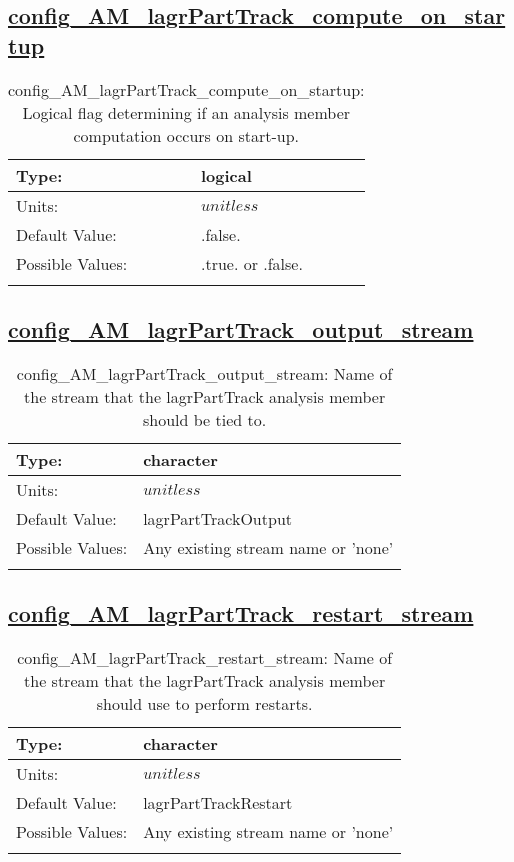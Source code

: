 \subsection[config\_AM\_lagrPartTrack\_compute\_on\_startup]{\hyperref[sec:nm_tab_AM_lagrPartTrack]{config\_AM\_lagrPartTrack\_compute\_on\_startup}}
\label{subsec:nm_sec_config_AM_lagrPartTrack_compute_on_startup}
\begin{center}
\begin{longtable}{| p{2.0in} || p{4.0in} |}
    \hline
    Type: & logical \\
    \hline
    Units: & $unitless$ \\
    \hline
    Default Value: & .false. \\
    \hline
    Possible Values: & .true. or .false. \\
    \hline
    \caption{config\_AM\_lagrPartTrack\_compute\_on\_startup: Logical flag determining if an analysis member computation occurs on start-up.}
\end{longtable}
\end{center}
\subsection[config\_AM\_lagrPartTrack\_output\_stream]{\hyperref[sec:nm_tab_AM_lagrPartTrack]{config\_AM\_lagrPartTrack\_output\_stream}}
\label{subsec:nm_sec_config_AM_lagrPartTrack_output_stream}
\begin{center}
\begin{longtable}{| p{2.0in} || p{4.0in} |}
    \hline
    Type: & character \\
    \hline
    Units: & $unitless$ \\
    \hline
    Default Value: & lagrPartTrackOutput \\
    \hline
    Possible Values: & Any existing stream name or 'none' \\
    \hline
    \caption{config\_AM\_lagrPartTrack\_output\_stream: Name of the stream that the lagrPartTrack analysis member should be tied to.}
\end{longtable}
\end{center}
\subsection[config\_AM\_lagrPartTrack\_restart\_stream]{\hyperref[sec:nm_tab_AM_lagrPartTrack]{config\_AM\_lagrPartTrack\_restart\_stream}}
\label{subsec:nm_sec_config_AM_lagrPartTrack_restart_stream}
\begin{center}
\begin{longtable}{| p{2.0in} || p{4.0in} |}
    \hline
    Type: & character \\
    \hline
    Units: & $unitless$ \\
    \hline
    Default Value: & lagrPartTrackRestart \\
    \hline
    Possible Values: & Any existing stream name or 'none' \\
    \hline
    \caption{config\_AM\_lagrPartTrack\_restart\_stream: Name of the stream that the lagrPartTrack analysis member should use to perform restarts.}
\end{longtable}
\end{center}
